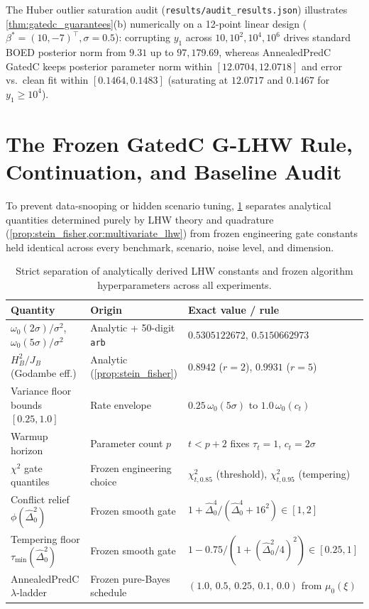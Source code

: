 \documentclass[11pt,a4paper,reqno]{amsart}
\theoremstyle{definition}
\theoremstyle{remark}
\begin{document}
The Huber outlier saturation audit (\texttt{results/audit\_results.json}) illustrates \cref{thm:gatedc_guarantees}(b) numerically on a 12-point linear design ($\beta^* = (10, -7)^\top, \sigma = 0.5$): corrupting $y_1$ across $10, 10^2, 10^4, 10^6$ drives standard BOED posterior norm from $9.31$ up to $97{,}179.69$, whereas AnnealedPredC GatedC keeps posterior parameter norm within $[12.0704, 12.0718]$ and error vs.\ clean fit within $[0.1464, 0.1483]$ (saturating at $12.0717$ and $0.1467$ for $y_1 \ge 10^4$).

\section{The Frozen GatedC G-LHW Rule, Continuation, and Baseline Audit}\label{sec:algorithm}

To prevent data-snooping or hidden scenario tuning, \cref{tab:hyperparams} separates analytical quantities determined purely by LHW theory and quadrature (\cref{prop:stein_fisher,cor:multivariate_lhw}) from frozen engineering gate constants held identical across every benchmark, scenario, noise level, and dimension.

\begin{table}[t]
\centering
\small
\caption{Strict separation of analytically derived LHW constants and frozen algorithm hyperparameters across all experiments.}\label{tab:hyperparams}
\begin{tabular}{@{}lll@{}}
\toprule
Quantity & Origin & Exact value / rule \\
\midrule
$\omega_0(2\sigma)/\sigma^2$, $\omega_0(5\sigma)/\sigma^2$ & Analytic + 50-digit \texttt{arb} & $0.5305122672$, $0.5150662973$ \\
$H_B^2/J_B$ (Godambe eff.) & Analytic (\cref{prop:stein_fisher}) & $0.8942$ ($r=2$), $0.9931$ ($r=5$) \\
Variance floor bounds $[0.25, 1.0]$ & Rate envelope & $0.25\,\omega_0(5\sigma)$ to $1.0\,\omega_0(c_t)$ \\
Warmup horizon & Parameter count $p$ & $t < p + 2$ fixes $\tau_t = 1$, $c_t = 2\sigma$ \\
$\chi^2$ gate quantiles & Frozen engineering choice & $\chi^2_{t, 0.85}$ (threshold), $\chi^2_{t, 0.95}$ (tempering) \\
Conflict relief $\phi(\hat{\Delta}_0^2)$ & Frozen smooth gate & $1 + \hat{\Delta}_0^4 / (\hat{\Delta}_0^4 + 16^2) \in [1, 2]$ \\
Tempering floor $\tau_{\min}(\hat{\Delta}_0^2)$ & Frozen smooth gate & $1 - 0.75 / (1 + (\hat{\Delta}_0^2 / 4)^2) \in [0.25, 1]$ \\
AnnealedPredC $\lambda$-ladder & Frozen pure-Bayes schedule & $(1.0,\, 0.5,\, 0.25,\, 0.1,\, 0.0)$ from $\mu_0(\xi)$ \\
\bottomrule
\end{tabular}
\end{table}
\end{document}
